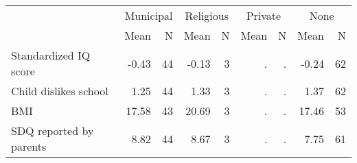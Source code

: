 \begin{tabular}{l r r r r r r r r}
\toprule
& \multicolumn{2}{c}{Municipal} & \multicolumn{2}{c}{Religious} & \multicolumn{2}{c}{Private} & \multicolumn{2}{c}{None} \\
& \scriptsize Mean & \scriptsize N & \scriptsize Mean & \scriptsize N & \scriptsize Mean & \scriptsize N & \scriptsize Mean & \scriptsize N \\
\midrule
Standardized IQ score &     -0.43 &        44 &     -0.13 &         3 &         . & . &     -0.24 &        62 \\
Child dislikes school &      1.25 &        44 &      1.33 &         3 &         . & . &      1.37 &        62 \\
BMI &     17.58 &        43 &     20.69 &         3 &         . & . &     17.46 &        53 \\
SDQ reported by parents &      8.82 &        44 &      8.67 &         3 &         . & . &      7.75 &        61 \\
\bottomrule
\end{tabular}
